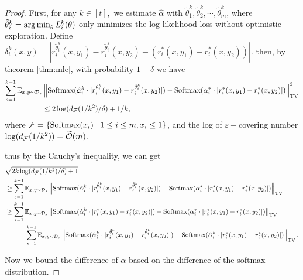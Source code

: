 \begin{proof}
First,  for any $k \in [t],$  we estimate $\hat{\alpha}$ with $\tilde{\theta}_1^k, \tilde{\theta}_2^k, \cdots, \tilde{\theta}_m^k$, where $\tilde{\theta}_i^k = \operatorname*{arg\,min}_\theta L_i^k(\theta)$ only minimizes the log-likelihood loss without optimistic exploration. Define $\delta_i^k(x,y)=\left|r_i^{\tilde{\theta}_i^k}(x,y_1) - r_i^{\tilde{\theta}_i^k}(x,y_2) - (r_i^*(x,y_1) - r_i^*(x,y_2))\right|$.
then, by theorem \ref{thm:mle}, with probability $1-\delta$ we have 
\begin{align*}
    \sum_{s=1}^{k-1} \mathbb{E}_{x, y\sim \mathcal{D}_s}&\left\| \textrm{Softmax}(\hat{\alpha}_i^k \cdot |r_i^{\tilde{\theta}_i^k}(x,y_1)-r_i^{\tilde{\theta}_i^k}(x,y_2)|)-\textrm{Softmax}(\alpha_i^*\cdot |r_i^*(x,y_1)-r_i^*(x,y_2)|)\right\| _{\mathrm{TV}}^2\\
    &\le 2 \log (d_{\mathcal{F}}(1/k^2)/\delta)+1/k,
\end{align*}
    where $\mathcal{F} = \{\mathrm{Softmax}(x_i)\mid 1\le i\le m, x_i \le 1\}$, and the log of $\varepsilon-$covering number $\log (d_{\mathcal{F}}(1/k^2)) = \widetilde{\mathcal{O}}(m)$.

    thus by the Cauchy's inequality, we can get 
    \begin{align}
        &\sqrt{2k\log(d_{\mathcal{F}}(1/k^2)/\delta)+1}\nonumber \\&\ge \sum_{s=1}^{k-1} \mathbb{E}_{x, y\sim \mathcal{D}_s}\left\| \textrm{Softmax}(\hat{\alpha}_i^k \cdot |r_i^{\tilde{\theta}_i^k}(x,y_1)-r_i^{\tilde{\theta}_i^k}(x,y_2)|)-\textrm{Softmax}(\alpha_i^*\cdot |r_i^*(x,y_1)-r_i^*(x,y_2)|)\right\| _{\mathrm{TV}}\nonumber\\
        &\ge \sum_{s=1}^{k-1} \mathbb{E}_{x, y\sim \mathcal{D}_s}\left\| \textrm{Softmax}(\hat{\alpha}_i^k \cdot |r_i^*(x,y_1)-r_i^*(x,y_2)|)-\textrm{Softmax}(\alpha_i^*\cdot |r_i^*(x,y_1)-r_i^*(x,y_2)|)\right\| _{\mathrm{TV}}\nonumber\\
        &\qquad - \sum_{s=1}^{k-1} \mathbb{E}_{x, y\sim \mathcal{D}_s}\left\| \textrm{Softmax}(\hat{\alpha}_i^k \cdot |r_i^{\tilde{\theta}_i^k}(x,y_1)-r_i^{\tilde{\theta}_i^k}(x,y_2)|)-\textrm{Softmax}(\hat{\alpha}_i^k\cdot |r_i^*(x,y_1)-r_i^*(x,y_2)|)\right\| _{\mathrm{TV}}.\label{alpha:step1}
    \end{align}

    Now we bound the difference of $\alpha$ based on the difference of the softmax distribution.


\end{proof}
